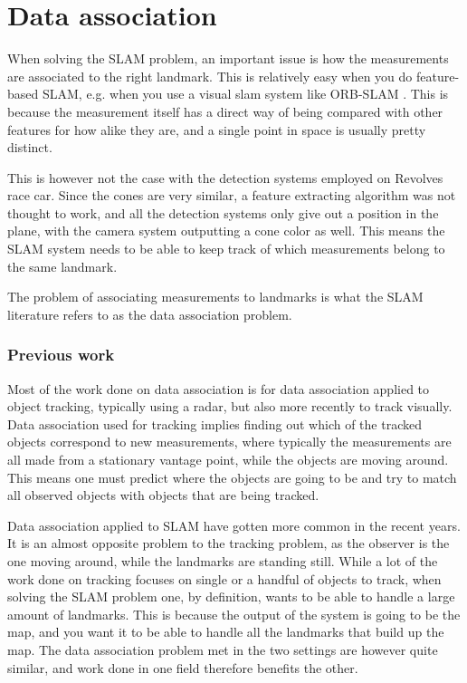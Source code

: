 \section{Data association}

When solving the \gls{SLAM} problem, an important issue is how the measurements are associated to the right landmark. This is relatively easy when you do feature-based \gls{SLAM}, e.g. when you use a visual slam system like ORB-SLAM \cite{ORBSLAM}. This is because the measurement itself has a direct way of being compared with other features for how alike they are, and a single point in space is usually pretty distinct. 

This is however not the case with the detection systems employed on Revolves race car. Since the cones are very similar, a feature extracting algorithm was not thought to work, and all the detection systems only give out a position in the plane, with the camera system outputting a cone color as well. This means the SLAM system needs to be able to keep track of which measurements belong to the same landmark. 

The problem of associating measurements to landmarks is what the SLAM literature refers to as the data association problem.

\subsubsection{Previous work}

Most of the work done on data association is for data association applied to object tracking, typically using a radar\cite{RadarTracking}, but also more recently to track visually\cite{VisualTracking}. Data association used for tracking implies finding out which of the tracked objects correspond to new measurements, where typically the measurements are all made from a stationary vantage point, while the objects are moving around. This means one must predict where the objects are going to be and try to match all observed objects with objects that are being tracked. 

Data association applied to \gls{SLAM} have gotten more common in the recent years. It is an almost opposite problem to the tracking problem, as the observer is the one moving around, while the landmarks are standing still. While a lot of the work done on tracking focuses on single or a handful of objects to track, when solving the \gls{SLAM} problem one, by definition, wants to be able to handle a large amount of landmarks. This is because the output of the system is going to be the map, and you want it to be able to handle all the landmarks that build up the map. The data association problem met in the two settings are however quite similar, and work done in one field therefore benefits the other. 

